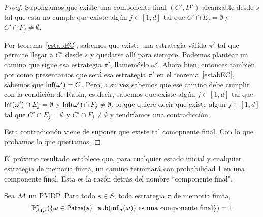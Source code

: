 \begin{proof}
	Supongamos que existe una componente final $(C', D')$ alcanzable desde $s$ tal que esta no cumple que existe algún $j \in [1, d]$ tal que $C' \cap E_j= \emptyset$ y $C' \cap F_j \neq \emptyset$.

	Por teorema~\ref{estabEC}, sabemos que existe una estrategia válida $\pi'$ tal
	que permite llegar a $C'$ desde $s$ y quedarse allí para siempre. Podemos
	plantear un camino que sigue esa estrategia $\pi'$, llamemóslo $\omega'$. Ahora
	bien, entonces también por como presentamos que será esa estrategia $\pi'$ en
	el teorema~\ref{estabEC}, sabemos que $\textsf{Inf}(\omega') = C$. Pero, a su vez
	sabemos que ese camino debe cumplir con la condición de Rabin, es decir,
	sabemos que existe algún $j \in [1, d]$ tal que $\textsf{Inf}(\omega') \cap E_j =
		\emptyset$ y $\textsf{Inf}(\omega') \cap F_j \neq \emptyset$, lo que quiere decir que
	existe algún $j \in [1, d]$ tal que $C' \cap E_j= \emptyset$ y $C' \cap F_j
		\neq \emptyset$ y tendríamos una contradicción.

	Esta contradicción viene de suponer que existe tal comopnente final. Con lo que
	probamos lo que queríamos.
\end{proof}

El próximo resultado establece que, para cualquier estado inicial y cualquier
estrategia de memoria finita, un camino terminará con probabilidad 1 en una
componente final. Esta es la razón detrás del nombre ``componente final".

\begin{theorem} \label{teoFundEC}
	Sea $\mathcal{M}$ un PMDP. Para todo $s \in S$, toda estrategia $\pi$ de memoria finita,
	$$\mathbb{P}^\pi_{\mathcal{M}, s}(\{ \omega \in \textsf{Paths}(s) \mid \textsf{sub}(\textsf{inf}_\textsf{er}(\omega)) \text{ es una componente final}\}) = 1$$
\end{theorem}

